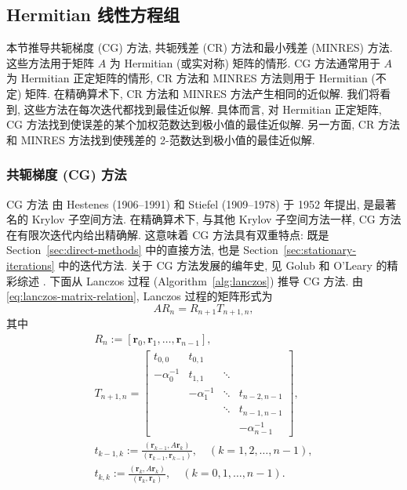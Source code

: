 \subsection{{Hermitian 线性方程组}}\label{sec:hermitian-linear-systems}
{本节推导共轭梯度 (CG) 方法, 共轭残差 (CR) 方法和最小残差 (MINRES) 方法. 这些方法用于矩阵 $A$ 为 Hermitian (或实对称) 矩阵的情形. CG 方法通常用于 $A$ 为 Hermitian 正定矩阵的情形, CR 方法和 MINRES 方法则用于 Hermitian (不定) 矩阵. 在精确算术下, CR 方法和 MINRES 方法产生相同的近似解. 我们将看到, 这些方法在每次迭代都找到最佳近似解. 具体而言, 对 Hermitian 正定矩阵, CG 方法找到使误差的某个加权范数达到极小值的最佳近似解. 另一方面, CR 方法和 MINRES 方法找到使残差的 2-范数达到极小值的最佳近似解.}
\subsubsection{{共轭梯度 (CG) 方法}}\label{subsec:conjugate-gradient}
{CG 方法  由 Hestenes (1906--1991) 和 Stiefel (1909--1978) 于 1952 年提出, 是最著名的 Krylov 子空间方法. 在精确算术下, 与其他 Krylov 子空间方法一样, CG 方法在有限次迭代内给出精确解. 这意味着 CG 方法具有双重特点: 既是 Section\ \ref{sec:direct-methods} 中的直接方法, 也是 Section\ \ref{sec:stationary-iterations} 中的迭代方法. 关于 CG 方法发展的编年史, 见 Golub 和 O’Leary 的精彩综述 .}
{下面从 Lanczos 过程 (Algorithm\ \ref{alg:lanczos}) 推导 CG 方法. 由 \eqref{eq:lanczos-matrix-relation}, Lanczos 过程的矩阵形式为}
\begin{equation}\label{eq:cg-lanczos-residual-matrix}AR_n=R_{n+1}T_{n+1,n},\end{equation}
{其中}
\[\begin{gathered}
R_n:=[\bm r_0,\bm r_1,\ldots,\bm r_{n-1}],\\
T_{n+1,n}=\begin{bmatrix}t_{0,0}&t_{0,1}&&\\-\alpha_0^{-1}&t_{1,1}&\ddots&\\&-\alpha_1^{-1}&\ddots&t_{n-2,n-1}\\&&\ddots&t_{n-1,n-1}\\&&&-\alpha_{n-1}^{-1}\end{bmatrix},\\
t_{k-1,k}:=\frac{(\bm r_{k-1},A\bm r_k)}{(\bm r_{k-1},\bm r_{k-1})},\quad(k=1,2,\ldots,n-1),\\
t_{k,k}:=\frac{(\bm r_k,A\bm r_k)}{(\bm r_k,\bm r_k)},\quad(k=0,1,\ldots,n-1).
\end{gathered}\]
